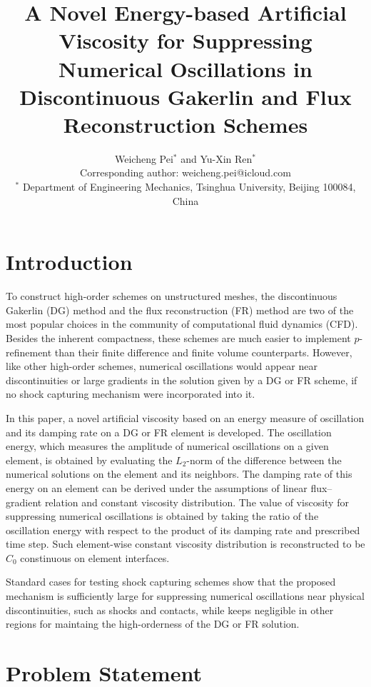 \documentclass[10pt]{article}
\title{
\bf A Novel Energy-based Artificial Viscosity for Suppressing Numerical Oscillations in Discontinuous Gakerlin and Flux Reconstruction Schemes
}
\author{
Weicheng Pei$^{*}$ and Yu-Xin Ren$^{*}$\\
Corresponding author: weicheng.pei@icloud.com\\
$^{*}$ Department of Engineering Mechanics, Tsinghua University, Beijing 100084, China
}
\date{}
\begin{document}
\maketitle
\afterpage{\fancyhead{}}

\centerline{
}
\vskip0.5cm 

\section{Introduction}
To construct high-order schemes on unstructured meshes, the discontinuous Gakerlin (DG) method and the flux reconstruction (FR) method are two of the most popular choices in the community of computational fluid dynamics (CFD).
%
Besides the inherent compactness, these schemes are much easier to implement $p$-refinement than their finite difference and finite volume counterparts.
%
However, like other high-order schemes, numerical oscillations would appear near discontinuities or large gradients in the solution given by a DG or FR scheme, if no shock capturing mechanism were incorporated into it.

In this paper, a novel artificial viscosity based on an energy measure of oscillation and its damping rate on a DG or FR element is developed.
%
The oscillation energy, which measures the amplitude of numerical oscillations on a given element, is obtained by evaluating the $L_2$-norm of the difference between the numerical solutions on the element and its neighbors.
%
The damping rate of this energy on an element can be derived under the assumptions of linear flux--gradient relation and constant viscosity distribution.
%
The value of viscosity for suppressing numerical oscillations is obtained by taking the ratio of the oscillation energy with respect to the product of its damping rate and prescribed time step.
%
Such element-wise constant viscosity distribution is reconstructed to be $C_0$ constinuous on element interfaces.

Standard cases for testing shock capturing schemes show that the proposed mechanism is sufficiently large for suppressing numerical oscillations near physical discontinuities, such as shocks and contacts, while keeps negligible in other regions for maintaing the high-orderness of the DG or FR solution.

\section{Problem Statement}
\end{document}

